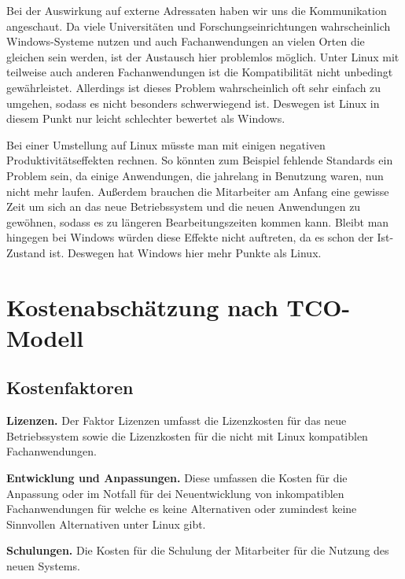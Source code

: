 \documentclass[12pt,utf8]{scrartcl}
\begin{document}
Bei der Auswirkung auf externe Adressaten haben wir uns die Kommunikation angeschaut. Da viele Universitäten und Forschungseinrichtungen wahrscheinlich Windows-Systeme nutzen und auch Fachanwendungen an vielen Orten die gleichen sein werden, ist der Austausch hier problemlos möglich. Unter Linux mit teilweise auch anderen Fachanwendungen ist die Kompatibilität nicht unbedingt gewährleistet. Allerdings ist dieses Problem wahrscheinlich oft sehr einfach zu umgehen, sodass es nicht besonders schwerwiegend ist. Deswegen ist Linux in diesem Punkt nur leicht schlechter bewertet als Windows.

Bei einer Umstellung auf Linux müsste man mit einigen negativen Produktivitätseffekten rechnen. So könnten zum Beispiel fehlende Standards ein Problem sein, da einige Anwendungen, die jahrelang in Benutzung waren, nun nicht mehr laufen. Außerdem brauchen die Mitarbeiter am Anfang eine gewisse Zeit um sich an das neue Betriebssystem und die neuen Anwendungen zu gewöhnen, sodass es zu längeren Bearbeitungszeiten kommen kann. Bleibt man hingegen bei Windows würden diese Effekte nicht auftreten, da es schon der Ist-Zustand ist. Deswegen hat Windows hier mehr Punkte als Linux. 

\newpage
\section*{Kostenabschätzung nach TCO-Modell}

\subsection*{Kostenfaktoren}

\textbf{Lizenzen.} Der Faktor Lizenzen umfasst die Lizenzkosten für das neue Betriebssystem sowie die Lizenzkosten für die nicht mit Linux kompatiblen Fachanwendungen.
\newline

\textbf{Entwicklung und Anpassungen.} Diese umfassen die Kosten für die Anpassung oder im Notfall für dei Neuentwicklung von inkompatiblen Fachanwendungen für welche es keine Alternativen oder zumindest keine Sinnvollen Alternativen unter Linux gibt.
\newline

\textbf{Schulungen.} Die Kosten für die Schulung der Mitarbeiter für die Nutzung des neuen Systems.
\newline
\end{document}
